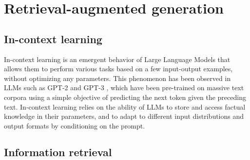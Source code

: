 \section{Retrieval-augmented generation}
\subsection{In-context learning}
In-context learning is an emergent behavior of Large Language Models that allows them to perform various tasks based on a few input-output examples, without optimizing any parameters. This phenomenon has been observed in LLMs such as GPT-2 \cite{radford2019language} and GPT-3 \cite{NEURIPS2020_1457c0d6}, which have been pre-trained on massive text corpora using a simple objective of predicting the next token given the preceding text. In-context learning relies on the ability of LLMs to store and access factual knowledge in their parameters, and to adapt to different input distributions and output formats by conditioning on the prompt. 
\subsection{Information retrieval}

